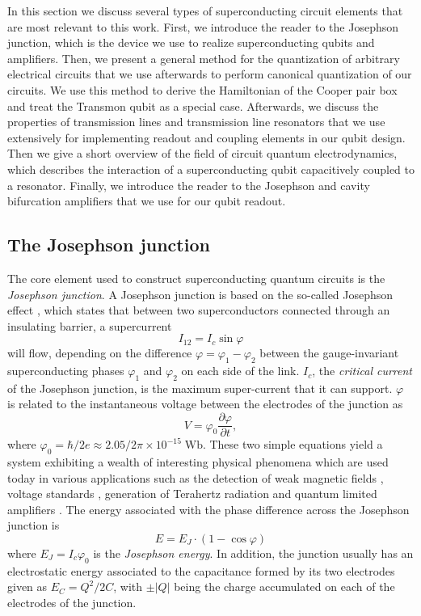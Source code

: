 In this section we discuss several types of superconducting circuit elements that are most relevant to this work. First, we introduce the reader to the Josephson junction, which is the device we use to realize superconducting qubits and amplifiers. Then, we present a general method for the quantization of arbitrary electrical circuits that we use afterwards to perform canonical quantization of our circuits. We use this method to derive the Hamiltonian of the Cooper pair box and treat the Transmon qubit as a special case. Afterwards, we discuss the properties of transmission lines and transmission line resonators that we use extensively for implementing readout and coupling elements in our qubit design. Then we give a short overview of the field of circuit quantum electrodynamics, which describes the interaction of a superconducting qubit capacitively coupled to a  resonator. Finally, we introduce the reader to the Josephson and cavity bifurcation amplifiers that we use for our qubit readout.

\subsection{The Josephson junction}

The core element used to construct superconducting quantum circuits is the {\it Josephson junction}. A Josephson junction is based on the so-called Josephson effect \citep{josephson_possible_1962}, which states that between two superconductors connected through an insulating barrier, a supercurrent
%
\begin{equation}
I_{12} = I_c\sin{\varphi}
\end{equation}
%
will flow, depending on the difference $\varphi = \varphi_1-\varphi_2$ between the gauge-invariant superconducting phases $\varphi_1$ and $\varphi_2$ on each side of the link. $I_c$, the {\it critical current} of the Josephson junction, is the maximum super-current that it can support. $\varphi$ is related to the instantaneous voltage between the electrodes of the junction as
%
\begin{equation}
V = \varphi_0\frac{\partial \varphi}{\partial t},
\end{equation}
%
where $\varphi_0 =\hbar/2e \approx 2.05/2\pi\times 10^{-15}\;\mathrm{Wb}$. These two simple equations yield a system exhibiting a  wealth of interesting physical phenomena which are used today in various applications such as the detection of weak magnetic fields \citep{clarke_squid_2005}, voltage standards \citep{levinsen_inverse_1977}, generation of Terahertz radiation \citep{ozyuzer_emission_2007} and quantum limited amplifiers \citep{vijay_invited_2009}. The energy associated with the phase difference across the Josephson junction is
%
\begin{equation}
E = E_J\cdot(1-\cos{\varphi})
\end{equation}
%
where $E_J = I_c\varphi_0$ is the {\it Josephson energy}. In addition, the junction usually has an electrostatic energy associated to the capacitance formed by its two electrodes given as $E_C = Q^2/2C$, with $\pm|Q|$ being the charge accumulated on each of the electrodes of the junction.

